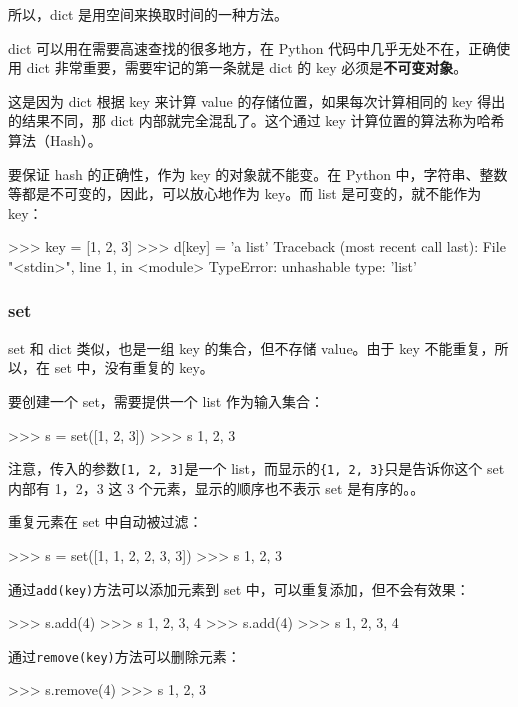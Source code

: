 所以，dict 是用空间来换取时间的一种方法。

dict 可以用在需要高速查找的很多地方，在 Python
代码中几乎无处不在，正确使用 dict 非常重要，需要牢记的第一条就是 dict 的
key 必须是\textbf{不可变对象}。

这是因为 dict 根据 key 来计算 value 的存储位置，如果每次计算相同的 key
得出的结果不同，那 dict 内部就完全混乱了。这个通过 key
计算位置的算法称为哈希算法（Hash）。

要保证 hash 的正确性，作为 key 的对象就不能变。在 Python
中，字符串、整数等都是不可变的，因此，可以放心地作为 key。而 list
是可变的，就不能作为 key：

\begin{pythoncode}
>>> key = [1, 2, 3]
>>> d[key] = 'a list'
Traceback (most recent call last):
  File "<stdin>", line 1, in <module>
TypeError: unhashable type: 'list'
\end{pythoncode}

\hypertarget{set}{%
\subsubsection{set}\label{set}}

set 和 dict 类似，也是一组 key 的集合，但不存储 value。由于 key
不能重复，所以，在 set 中，没有重复的 key。

要创建一个 set，需要提供一个 list 作为输入集合：

\begin{pythoncode}
>>> s = set([1, 2, 3])
>>> s
{1, 2, 3}
\end{pythoncode}

注意，传入的参数\texttt{{[}1,\ 2,\ 3{]}}是一个
list，而显示的\texttt{\{1,\ 2,\ 3\}}只是告诉你这个 set 内部有 1，2，3 这
3 个元素，显示的顺序也不表示 set 是有序的。。

重复元素在 set 中自动被过滤：

\begin{pythoncode}
>>> s = set([1, 1, 2, 2, 3, 3])
>>> s
{1, 2, 3}
\end{pythoncode}

通过\texttt{add(key)}方法可以添加元素到 set
中，可以重复添加，但不会有效果：

\begin{pythoncode}
>>> s.add(4)
>>> s
{1, 2, 3, 4}
>>> s.add(4)
>>> s
{1, 2, 3, 4}
\end{pythoncode}

通过\texttt{remove(key)}方法可以删除元素：

\begin{pythoncode}
>>> s.remove(4)
>>> s
{1, 2, 3}
\end{pythoncode}

